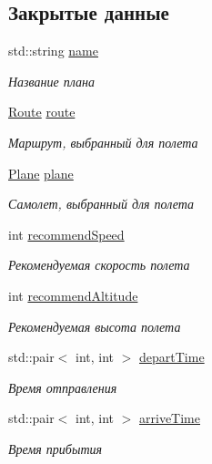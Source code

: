 \subsection*{Закрытые данные}
\begin{DoxyCompactItemize}
\item 
std\+::string \hyperlink{class_plan_of_flight_afd9a45241cb0ae50015e31c414629206}{name}
\begin{DoxyCompactList}\small\item\em Название плана \end{DoxyCompactList}\item 
\hyperlink{class_route}{Route} \hyperlink{class_plan_of_flight_a2408d478ac487707ca9872d34d91d546}{route}
\begin{DoxyCompactList}\small\item\em Маршрут, выбранный для полета \end{DoxyCompactList}\item 
\hyperlink{class_plane}{Plane} \hyperlink{class_plan_of_flight_a2d25d26b62f203d093ed65284dc97b47}{plane}
\begin{DoxyCompactList}\small\item\em Самолет, выбранный для полета \end{DoxyCompactList}\item 
int \hyperlink{class_plan_of_flight_ae9373a9180eeb0d5b16f17708632de0c}{recommend\+Speed}
\begin{DoxyCompactList}\small\item\em Рекомендуемая скорость полета \end{DoxyCompactList}\item 
int \hyperlink{class_plan_of_flight_a139966275c45fc4f73bff2e9e9fe50cd}{recommend\+Altitude}
\begin{DoxyCompactList}\small\item\em Рекомендуемая высота полета \end{DoxyCompactList}\item 
std\+::pair$<$ int, int $>$ \hyperlink{class_plan_of_flight_ab852aa62bb45b7c619dc07abf424fa52}{depart\+Time}
\begin{DoxyCompactList}\small\item\em Время отправления \end{DoxyCompactList}\item 
std\+::pair$<$ int, int $>$ \hyperlink{class_plan_of_flight_ae7b7991afcc8ec1e02dac388d45ef9e9}{arrive\+Time}
\begin{DoxyCompactList}\small\item\em Время прибытия \end{DoxyCompactList}\item 

\end{DoxyCompactItemize}
